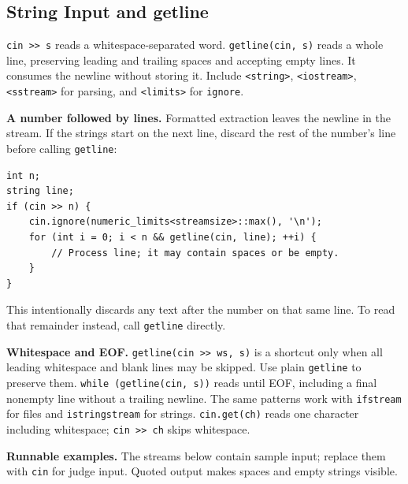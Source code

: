 \begingroup
\raggedright
\subsection{String Input and getline}
\texttt{cin >> s} reads a whitespace-separated word.
\texttt{getline(cin, s)} reads a whole line, preserving leading and
trailing spaces and accepting empty lines. It consumes the newline
without storing it. Include \texttt{<string>}, \texttt{<iostream>},
\texttt{<sstream>} for parsing, and \texttt{<limits>} for \texttt{ignore}.

\medskip
\textbf{A number followed by lines.} Formatted extraction leaves the
newline in the stream. If the strings start on the next line, discard
the rest of the number's line before calling \texttt{getline}:
\begin{lstlisting}[style=C++,showstringspaces=false]
int n;
string line;
if (cin >> n) {
    cin.ignore(numeric_limits<streamsize>::max(), '\n');
    for (int i = 0; i < n && getline(cin, line); ++i) {
        // Process line; it may contain spaces or be empty.
    }
}
\end{lstlisting}
This intentionally discards any text after the number on that same
line. To read that remainder instead, call \texttt{getline} directly.

\medskip
\textbf{Whitespace and EOF.} \texttt{getline(cin >> ws, s)} is a
shortcut only when all leading whitespace and blank lines may be
skipped. Use plain \texttt{getline} to preserve them.
\texttt{while (getline(cin, s))} reads until EOF, including a final
nonempty line without a trailing newline. The same patterns work
with \texttt{ifstream} for files and \texttt{istringstream} for strings.
\texttt{cin.get(ch)} reads one character including whitespace;
\texttt{cin >> ch} skips whitespace.

\medskip
\textbf{Runnable examples.} The streams below contain sample input;
replace them with \texttt{cin} for judge input. Quoted output makes
spaces and empty strings visible.

\endgroup
